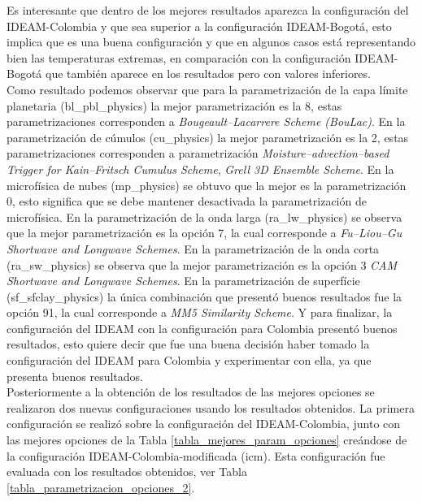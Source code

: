 \begin{itemize}
Es interesante que dentro de los mejores resultados aparezca la configuración del IDEAM-Colombia y que sea superior a la configuración IDEAM-Bogotá, esto implica que es una buena configuración y que en algunos casos está representando bien las temperaturas extremas, en comparación con la configuración IDEAM-Bogotá que también aparece en los resultados pero con valores inferiores.\\

Como resultado podemos observar que para la parametrización de la capa límite planetaria (bl\_pbl\_physics) la mejor parametrización es la 8, estas parametrizaciones corresponden a \textit{Bougeault–Lacarrere Scheme (BouLac)}. En la parametrización de cúmulos (cu\_physics) la mejor parametrización es la 2, estas parametrizaciones corresponden a parametrización \textit{Moisture–advection–based Trigger for Kain–Fritsch Cumulus Scheme}, \textit{Grell 3D Ensemble Scheme}. En la microfísica de nubes (mp\_physics) se obtuvo que la mejor es la parametrización 0, esto significa que se debe mantener desactivada la parametrización de microfísica. En la parametrización de la onda larga (ra\_lw\_physics) se observa que la mejor parametrización es la opción 7, la cual corresponde a \textit{Fu–Liou–Gu Shortwave and Longwave Schemes}. En la parametrización de la onda corta (ra\_sw\_physics) se observa que la mejor parametrización es la opción 3 \textit{CAM Shortwave and Longwave Schemes}. En la parametrización de superfície (sf\_sfclay\_physics) la única combinación que presentó buenos resultados fue la opción 91, la cual corresponde a \textit{MM5 Similarity Scheme}. Y para finalizar, la configuración del IDEAM con la configuración para Colombia presentó buenos resultados, esto quiere decir que fue una buena decisión haber tomado la configuración del IDEAM para Colombia y experimentar con ella, ya que presenta buenos resultados.\\

Posteriormente a la obtención de los resultados de las mejores opciones se realizaron dos nuevas configuraciones usando los resultados obtenidos. La primera configuración se realizó sobre la configuración del IDEAM-Colombia, junto con las mejores opciones de la Tabla \ref{tabla_mejores_param_opciones} creándose de la configuración IDEAM-Colombia-modificada (icm). Esta configuración fue evaluada con los resultados obtenidos, ver Tabla \ref{tabla_parametrizacion_opciones_2}.


\end{itemize}
